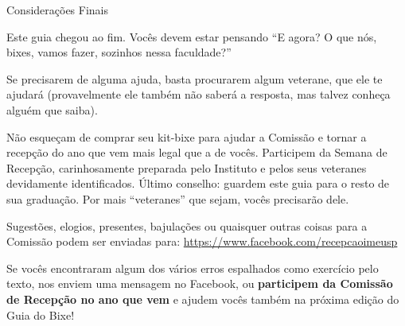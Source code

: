 \begin{secao}{Considerações Finais}

Este guia chegou ao fim. Vocês devem estar pensando ``E agora? O que nós, bixes,
vamos fazer, sozinhos nessa faculdade?''

Se precisarem de alguma ajuda, basta procurarem algum veterane, que ele te
ajudará (provavelmente ele também não saberá a resposta, mas talvez conheça
alguém que saiba).

Não esqueçam de comprar seu kit-bixe para ajudar a Comissão e tornar a recepção
do ano que vem mais legal que a de vocês. Participem da Semana de Recepção,
carinhosamente preparada pelo Instituto e pelos seus veteranes devidamente
identificados. Último conselho: guardem este guia para o resto de sua graduação.
Por mais ``veteranes'' que sejam, vocês precisarão dele.

Sugestões, elogios, presentes, bajulações ou quaisquer outras coisas para a
Comissão podem ser enviadas para: \url{https://www.facebook.com/recepcaoimeusp}

Se vocês encontraram algum dos vários erros espalhados como exercício pelo texto,
nos enviem uma mensagem no Facebook, ou \textbf{participem da Comissão de Recepção 
no ano que vem} e ajudem vocês também na próxima edição do Guia do Bixe!

\end{secao}
